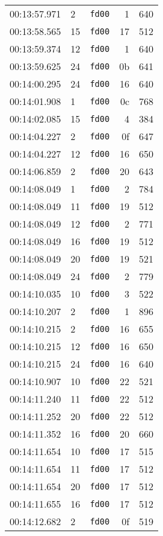 \documentclass{article}
\begin{document}
\begin{longtable}{lllrr}
00:13:57.971 & 2 & \texttt{fd00} & 1 & 640 \\
00:13:58.565 & 15 & \texttt{fd00} & 17 & 512 \\
00:13:59.374 & 12 & \texttt{fd00} & 1 & 640 \\
00:13:59.625 & 24 & \texttt{fd00} & 0b & 641 \\
00:14:00.295 & 24 & \texttt{fd00} & 16 & 640 \\
00:14:01.908 & 1 & \texttt{fd00} & 0c & 768 \\
00:14:02.085 & 15 & \texttt{fd00} & 4 & 384 \\
00:14:04.227 & 2 & \texttt{fd00} & 0f & 647 \\
00:14:04.227 & 12 & \texttt{fd00} & 16 & 650 \\
00:14:06.859 & 2 & \texttt{fd00} & 20 & 643 \\
00:14:08.049 & 1 & \texttt{fd00} & 2 & 784 \\
00:14:08.049 & 11 & \texttt{fd00} & 19 & 512 \\
00:14:08.049 & 12 & \texttt{fd00} & 2 & 771 \\
00:14:08.049 & 16 & \texttt{fd00} & 19 & 512 \\
00:14:08.049 & 20 & \texttt{fd00} & 19 & 521 \\
00:14:08.049 & 24 & \texttt{fd00} & 2 & 779 \\
00:14:10.035 & 10 & \texttt{fd00} & 3 & 522 \\
00:14:10.207 & 2 & \texttt{fd00} & 1 & 896 \\
00:14:10.215 & 2 & \texttt{fd00} & 16 & 655 \\
00:14:10.215 & 12 & \texttt{fd00} & 16 & 650 \\
00:14:10.215 & 24 & \texttt{fd00} & 16 & 640 \\
00:14:10.907 & 10 & \texttt{fd00} & 22 & 521 \\
00:14:11.240 & 11 & \texttt{fd00} & 22 & 512 \\
00:14:11.252 & 20 & \texttt{fd00} & 22 & 512 \\
00:14:11.352 & 16 & \texttt{fd00} & 20 & 660 \\
00:14:11.654 & 10 & \texttt{fd00} & 17 & 515 \\
00:14:11.654 & 11 & \texttt{fd00} & 17 & 512 \\
00:14:11.654 & 20 & \texttt{fd00} & 17 & 512 \\
00:14:11.655 & 16 & \texttt{fd00} & 17 & 512 \\
00:14:12.682 & 2 & \texttt{fd00} & 0f & 519 \\

\end{longtable}
\end{document}
